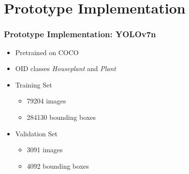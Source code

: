\documentclass{beamer}
\begin{document}
\section{Prototype Implementation}

\begin{frame}
  \frametitle{Prototype Implementation: YOLOv7n}
  \begin{minipage}[bt]{.49\textwidth}
    \begin{itemize}
      \setlength{\itemsep}{1.1\baselineskip}
    \item Pretrained on COCO
    \item OID classes \emph{Houseplant} and \emph{Plant}
    \item Training Set
      \begin{itemize}
      \item \num{79204} images
      \item \num{284130} bounding boxes
      \end{itemize}
    \item Validation Set
      \begin{itemize}
      \item \num{3091} images
      \item \num{4092} bounding boxes
      \end{itemize}
    \end{itemize}
  \end{minipage}
  \begin{minipage}[bt]{.49\textwidth}
    \vspace{.5cm}
    \begin{figure}
      \begin{center}

\end{center}
\end{figure}
\end{minipage}
\end{frame}
\end{document}
